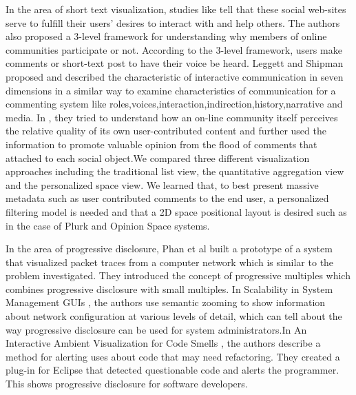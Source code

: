 \documentclass{sig-alternate}
\begin{document}
In the area of short text visualization, studies like \cite{Bishop:2007} tell that these social
web-sites serve to fulfill their users' desires to interact with and help others.
The authors also proposed a 3-level framework for understanding why members of online
communities participate or not. According to the 3-level framework, users make
comments or short-text post to have their voice be heard. Leggett and Shipman \cite{Leggett:04} 
proposed and described the characteristic of interactive communication in seven
dimensions in a similar way to examine characteristics of communication for a
commenting system like roles,voices,interaction,indirection,history,narrative
and media. In \cite{Hsu:09}, they tried to understand how an on-line community itself
perceives the relative quality of its own user-contributed content and further
used the information to promote valuable opinion from the flood of comments
that attached to each social object.We compared three different visualization
approaches including the traditional list view, the quantitative aggregation
view and the personalized space view. We learned that, to best present massive
metadata such as user contributed comments to the end user, a personalized
filtering model is needed and that a 2D space positional layout is desired
such as in the case of Plurk and Opinion Space systems.

In the area of progressive disclosure, Phan et al built a prototype of a system
that visualized packet traces from a computer network \cite{Phan:07} which is similar to
the problem investigated. They introduced the concept of progressive multiples
which combines progressive disclosure with small multiples. In Scalability in
System Management GUIs \cite{Dieberger:06}, the authors use semantic zooming to show information
about network configuration at various levels of detail, which can tell about
the way progressive disclosure can be used for system administrators.In An
Interactive Ambient Visualization for Code Smells \cite{Murphy:10}, the authors describe a
method for alerting uses about code that may need refactoring. They created a
plug-in for Eclipse that detected questionable code and alerts the programmer.
This shows progressive disclosure for software developers.
\end{document}
